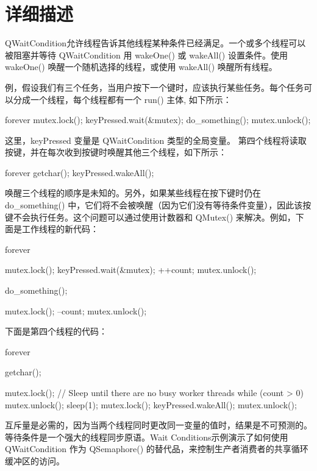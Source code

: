 \section{详细描述}

QWaitCondition允许线程告诉其他线程某种条件已经满足。一个或多个线程可以被阻塞并等待 QWaitCondition 用 wakeOne() 或 wakeAll() 设置条件。使用 wakeOne() 唤醒一个随机选择的线程，或使用 wakeAll() 唤醒所有线程。

例，假设我们有三个任务，当用户按下一个键时，应该执行某些任务。每个任务可以分成一个线程，每个线程都有一个 run() 主体, 如下所示：

\begin{cppcode}
forever {
	mutex.lock();
	keyPressed.wait(&mutex);
	do_something();
	mutex.unlock();
}
\end{cppcode}

这里，keyPressed 变量是 QWaitCondition 类型的全局变量。
第四个线程将读取按键，并在每次收到按键时唤醒其他三个线程，如下所示：

\begin{cppcode}
forever {
	getchar();
	keyPressed.wakeAll();
}
\end{cppcode}

唤醒三个线程的顺序是未知的。另外，如果某些线程在按下键时仍在 do\_something() 中，它们将不会被唤醒（因为它们没有等待条件变量），因此该按键不会执行任务。这个问题可以通过使用计数器和 QMutex() 来解决。例如，下面是工作线程的新代码：

\begin{cppcode}
forever {
	mutex.lock();
	keyPressed.wait(&mutex);
	++count;
	mutex.unlock();
	
	do_something();
	
	mutex.lock();
	--count;
	mutex.unlock();
}
\end{cppcode}

下面是第四个线程的代码：

\begin{cppcode}
forever {
	getchar();
	
	mutex.lock();
	// Sleep until there are no busy worker threads
	while (count > 0) {
		mutex.unlock();
		sleep(1);
		mutex.lock();
	}
	keyPressed.wakeAll();
	mutex.unlock();
}
\end{cppcode}

互斥量是必需的，因为当两个线程同时更改同一变量的值时，结果是不可预测的。
等待条件是一个强大的线程同步原语。Wait Conditions示例演示了如何使用 QWaitCondition 作为 QSemaphore() 的替代品，来控制生产者消费者的共享循环缓冲区的访问。

